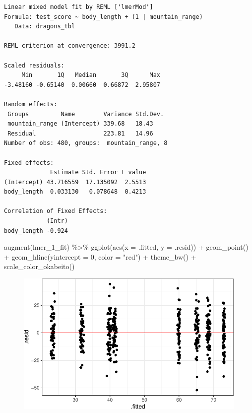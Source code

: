 \documentclass[
  letterpaper,
  DIV=11,
  oneside]{scrreport}
\newenvironment{Shaded}{\begin{snugshade}}{\end{snugshade}}
\newcommand{\AttributeTok}[1]{\textcolor[rgb]{0.40,0.45,0.13}{#1}}
\newcommand{\DecValTok}[1]{\textcolor[rgb]{0.68,0.00,0.00}{#1}}
\newcommand{\FunctionTok}[1]{\textcolor[rgb]{0.28,0.35,0.67}{#1}}
\newcommand{\NormalTok}[1]{\textcolor[rgb]{0.00,0.23,0.31}{#1}}
\newcommand{\SpecialCharTok}[1]{\textcolor[rgb]{0.37,0.37,0.37}{#1}}
\newcommand{\StringTok}[1]{\textcolor[rgb]{0.13,0.47,0.30}{#1}}
\begin{document}
\begin{verbatim}
Linear mixed model fit by REML ['lmerMod']
Formula: test_score ~ body_length + (1 | mountain_range)
   Data: dragons_tbl

REML criterion at convergence: 3991.2

Scaled residuals: 
     Min       1Q   Median       3Q      Max 
-3.48160 -0.65140  0.00660  0.66872  2.95807 

Random effects:
 Groups         Name        Variance Std.Dev.
 mountain_range (Intercept) 339.68   18.43   
 Residual                   223.81   14.96   
Number of obs: 480, groups:  mountain_range, 8

Fixed effects:
             Estimate Std. Error t value
(Intercept) 43.716559  17.135092  2.5513
body_length  0.033130   0.078648  0.4213

Correlation of Fixed Effects:
            (Intr)
body_length -0.924
\end{verbatim}

\begin{Shaded}
\begin{Highlighting}[]
\FunctionTok{augment}\NormalTok{(lmer\_1\_fit) }\SpecialCharTok{\%\textgreater{}\%} 
  \FunctionTok{ggplot}\NormalTok{(}\FunctionTok{aes}\NormalTok{(}\AttributeTok{x =}\NormalTok{ .fitted, }\AttributeTok{y =}\NormalTok{ .resid)) }\SpecialCharTok{+} 
  \FunctionTok{geom\_point}\NormalTok{() }\SpecialCharTok{+}
  \FunctionTok{geom\_hline}\NormalTok{(}\AttributeTok{yintercept =} \DecValTok{0}\NormalTok{, }\AttributeTok{color =} \StringTok{"red"}\NormalTok{) }\SpecialCharTok{+}
  \FunctionTok{theme\_bw}\NormalTok{() }\SpecialCharTok{+}
  \FunctionTok{scale\_color\_okabeito}\NormalTok{()}
\end{Highlighting}
\end{Shaded}

\begin{figure}[H]

{\centering \includegraphics{./stat-modeling-mixed_files/figure-pdf/unnamed-chunk-14-1.pdf}

}

\end{figure}
\end{document}
